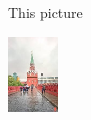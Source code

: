 \documentclass{article}
\begin{document}
This picture
\begin{center}
\includegraphics[height=2cm]{image}
\end{center}
\end{document}
